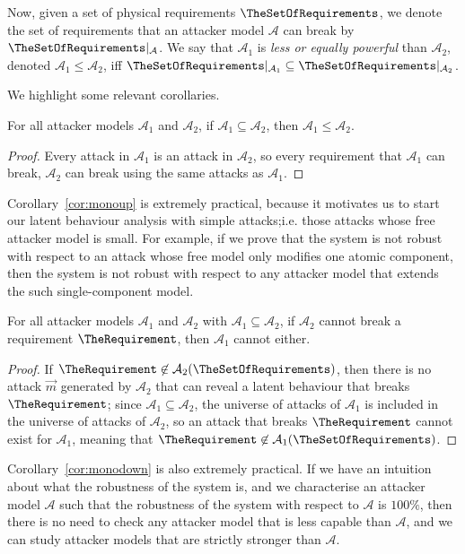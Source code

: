{\begin{definition}
  Now, given a set of physical requirements $\TheSetOfRequirements$, we denote the set of requirements that an attacker model $\mathcal{A}$ can break by $\TheSetOfRequirements|_{\mathcal{A}}$. We say that $\mathcal{A}_1$ is \emph{less or equally {powerful}} than $\mathcal{A}_2$, denoted $\mathcal{A}_1\leq \mathcal{A}_2$, iff $\TheSetOfRequirements|_{\mathcal{A}_1}\subseteq\TheSetOfRequirements|_{\mathcal{A}_2}$. 
\end{definition}
We highlight some relevant corollaries.
\begin{corollary}
  \label{cor:monoup}
  For all attacker models $\mathcal{A}_1$ and $\mathcal{A}_2$, if $\mathcal{A}_1\subseteq \mathcal{A}_2$, then $\mathcal{A}_1 \leq \mathcal{A}_2$. 
\end{corollary}
\begin{proof}
  Every attack in $\mathcal{A}_1$ is an attack in $\mathcal{A}_2$, so every requirement that $\mathcal{A}_1$ can break, $\mathcal{A}_2$ can break using the same attacks as $\mathcal{A}_1$.
\end{proof}
Corollary~\ref{cor:monoup} is extremely practical, because it motivates us to start our latent behaviour analysis with simple attacks;i.e. those attacks whose free attacker model is small. For example, if we prove that the system is not robust with respect to an attack whose free model only modifies one atomic component, then the system is not robust with respect to any attacker model that extends the such single-component model.

\begin{corollary}
  \label{cor:monodown}
  For all attacker models $\mathcal{A}_1$ and $\mathcal{A}_2$ with $\mathcal{A}_1\subseteq \mathcal{A}_2$, if $\mathcal{A}_2$ cannot break a requirement $\TheRequirement$, then $\mathcal{A}_1$ cannot either.
  \end{corollary}
  \begin{proof}
  If $\TheRequirement\not\in\mathcal{A}_2(\TheSetOfRequirements)$, then there is no attack $\vec{m}$ generated by $\mathcal{A}_2$ that can reveal a latent behaviour that breaks $\TheRequirement$; since $\mathcal{A}_1\subseteq \mathcal{A}_2$, the universe of attacks of $\mathcal{A}_1$ is included in the universe of attacks of $\mathcal{A}_2$, so an attack that breaks $\TheRequirement$ cannot exist for $\mathcal{A}_1$, meaning that $\TheRequirement\not\in\mathcal{A}_1(\TheSetOfRequirements)$.
  \end{proof}
  Corollary~\ref{cor:monodown} is also extremely practical. If we have an intuition about what the robustness of the system is, and we characterise an attacker model $\mathcal{A}$ such that the robustness of the system with respect to $\mathcal{A}$ is $100\%$, then there is no need to check any attacker model that is less capable than $\mathcal{A}$, and we can study attacker models that are strictly stronger than $\mathcal{A}$.

}
